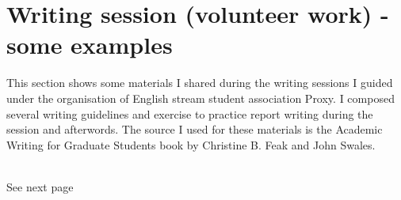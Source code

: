 \chapter{Writing session (volunteer work) - some examples}\label{appendices:volunteer}
This section shows some materials I shared during the writing sessions I guided under the organisation of English stream student association Proxy. I composed several writing guidelines and exercise to practice report writing during the session and afterwords. The source I used for these materials is the Academic Writing for Graduate Students book by Christine B. Feak and John Swales.\\\\
\begin{minipage}{0.5\textwidth}
\begin{flushleft}
\end{flushleft}
\end{minipage}
\hfill
\begin{minipage}{0.5\textwidth}
\begin{flushright}
   See next page
\end{flushright}
\end{minipage}



